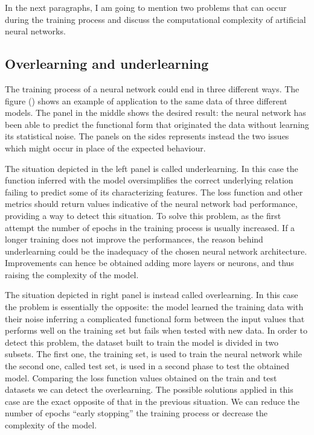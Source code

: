 \documentclass[a4paper,10pt]{report}
\begin{document}
In the next paragraphs, I am going to mention two problems that can occur during the training process 
and discuss the computational complexity of artificial neural networks.

\subsection{Overlearning and underlearning}

The training process of a neural network could end in three different ways.
The figure () shows an example of application to the same data of three different models.
The panel in the middle shows the desired result: the neural network has been able to predict the 
functional form that originated the data without learning its statistical noise.
The panels on the sides represents instead the two issues which might occur in place of 
the expected behaviour.

The situation depicted in the left panel is called underlearning. In this case the 
function inferred with the model oversimplifies the correct underlying relation failing 
to predict some of its characterizing features. The loss function and other metrics
should return values indicative of the neural network bad performance, providing
a way to detect this situation.
To solve this problem, as the first attempt the number of epochs in the training process is
usually increased. If a longer training does not improve the performances, the reason behind
underlearning could be the inadequacy of the chosen neural network architecture. 
Improvements can hence be obtained adding more layers or neurons, and thus raising the complexity of the model.

The situation depicted in right panel is instead called overlearning.
In this case the problem is essentially the opposite: the model learned the training data
with their noise inferring a complicated functional form between the input values that performs
well on the training set but fails when tested with new data. In order to detect this problem,
the dataset built to train the model is divided in two subsets. The first one, the training set, is used to
train the neural network while the second one, called test set, is used in a second phase to
test the obtained model.
Comparing the loss function values obtained on the train and test datasets we can
detect the overlearning. 
The possible solutions applied in this case are the exact opposite of that in the previous situation.
We can reduce the number of epochs ``early stopping'' the training process or decrease the complexity of
the model.
\end{document}
